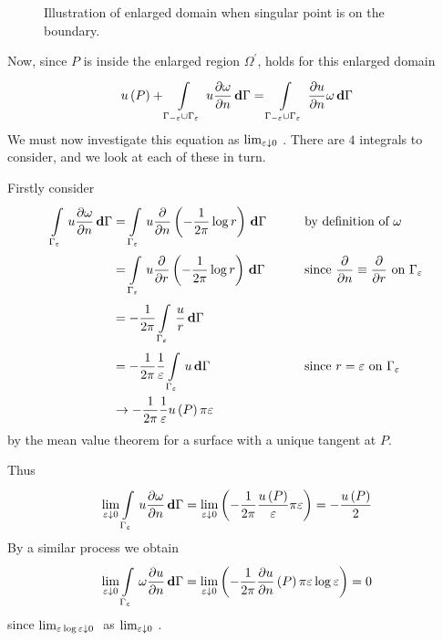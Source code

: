 \begin{figure}[htbp] \centering
  
  \caption{Illustration of enlarged domain when singular point is on the 
    boundary.}
  \label{fig:illus}
\end{figure}

Now, since $P$ is inside the enlarged region $\Omega^{\prime}$, 
holds for this enlarged domain \ie
\begin{equation}
   u\left( P \right) +   \displaystyle\int\limits_{\Gamma_{-\varepsilon} \cup \Gamma_{\varepsilon}}^{} \,u  
   \dfrac{\partial \omega}{\partial n} \, \boldsymbol{\mathrm{d}} \Gamma  =   \displaystyle\int\limits_{\Gamma_{-\varepsilon} \cup 
    \Gamma_{\varepsilon}}^{} \, \dfrac{\partial u}{\partial n} \omega\, \boldsymbol{\mathrm{d}} \Gamma  
  \label{eqn:endom}
\end{equation}
We must now investigate this equation as $\limita{\varepsilon}{0}$.  There
are $4$ integrals to consider, and we look at each of these in turn.

Firstly consider 
  \begin{alignat*}{2}
      \displaystyle\int\limits_{\Gamma_{\varepsilon}}^{} \,u  \dfrac{\partial \omega}{\partial n} \, \boldsymbol{\mathrm{d}} \Gamma  
    &=   \displaystyle\int\limits_{\Gamma_{\varepsilon}}^{} \,u  \dfrac{\partial  }{\partial n}  
    \left( -\dfrac{1}{2 \pi} \log r \right)\, \boldsymbol{\mathrm{d}} \Gamma  \qquad && 
    \text{by definition of $\omega$} \\
    &=   \displaystyle\int\limits_{\Gamma_{\varepsilon}}^{} \,u  \dfrac{\partial  }{\partial r}  
    \left( -\dfrac{1}{2 \pi} \log r \right)\, \boldsymbol{\mathrm{d}} \Gamma  &&
    \text{since $ \dfrac{\partial  }{\partial n}  \equiv  \dfrac{\partial  }{\partial  r} $ on 
      $\Gamma_{\varepsilon}$} \\
    &= -\dfrac{1}{2 \pi}   \displaystyle\int\limits_{\Gamma_{\varepsilon}}^{} \,\dfrac{u}{r}\, \boldsymbol{\mathrm{d}} \Gamma  && \\
    &= -\dfrac{1}{2 \pi} \dfrac{1}{\varepsilon} 
      \displaystyle\int\limits_{\Gamma_{\varepsilon}}^{} \,u\, \boldsymbol{\mathrm{d}} \Gamma  && 
    \text{since $r =\varepsilon$ on $\Gamma_{\varepsilon}$} \\ 
    &\rightarrow -\dfrac{1}{2 \pi} \dfrac{1}{\varepsilon}  u\left( P \right)  \pi 
    \varepsilon &&
  \end{alignat*}
by the mean value theorem for a surface with a unique tangent at $P$. 

Thus
\begin{equation}
  \limita{\varepsilon}{0}\gint{\Gamma_{\varepsilon}}{}{u  
  \delby{\omega}{n}}{\Gamma} =  \limita{\varepsilon}{0} 
  \pbrac{-\dfrac{1}{2 \pi} \dfrac{\fnof{u}{P}}{\varepsilon} \pi{\varepsilon}} 
  = - \dfrac{\fnof{u}{P}}{2} 
  \label{eqn:integ1}
\end{equation}
By a similar process we obtain
\begin{equation}
  \limita{\varepsilon}{0}\gint{\Gamma_{\varepsilon}}{}{\omega  
  \delby{u}{n}}{\Gamma} = \limita{\varepsilon}{0} 
  \pbrac{-\dfrac{1}{2 \pi} \fnof{\delby{u}{n}}{P} \pi \varepsilon \log
    \varepsilon} = 0 
  \label{eqn:integ2}
\end{equation}
since $\limita{\varepsilon \log \varepsilon}{0}$ as $\limita{\varepsilon}{0}$.


